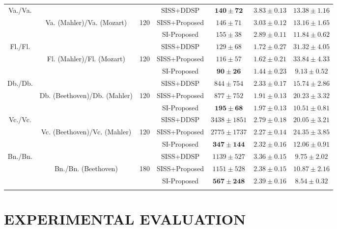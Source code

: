 \documentclass{article}
\def\tthline{\noalign{\hrule height 1.4pt}}
\begin{document}
\begin{table*}[tb]
{\begin{tabular}{ccc|c|ccc}
\multirow{3}{*}{Va./Va.}
& & &SISS+DDSP  & $\mathbf{140\pm{72}}$  & $3.83\pm{0.13}$& $13.38\pm{1.16}$\\
& Va. (Mahler)/Va. (Mozart) & 120 &SISS+Proposed & $146\pm{71}$ 
& $3.03\pm{0.12}$ & $13.16\pm{1.65}$ \\
& & &SI-Proposed  & $155\pm{38}$  & $\mathbf{2.89\pm{0.11}}$ & $\mathbf{11.84\pm{0.62}}$\\\hline

\multirow{3}{*}{Fl./Fl.}
& & &SISS+DDSP  & $129\pm{68}$  & $1.72\pm{0.27}$& $31.32\pm{4.05}$\\
& Fl. (Mahler)/Fl. (Mozart) & 120 &SISS+Proposed & $116\pm{57}$ 
& $1.62\pm{0.21}$ & $33.84\pm{4.33}$\\
& & &SI-Proposed  & $\mathbf{90\pm{26}}$  & $\mathbf{1.44\pm{0.23}}$ & $\mathbf{9.13\pm{0.52}}$\\\hline

\multirow{3}{*}{Db./Db.}
& & &SISS+DDSP  & $844\pm{754}$  & $2.33\pm{0.17}$ & $15.74\pm{2.86}$\\
& Db. (Beethoven)/Db. (Mahler) & 120 &SISS+Proposed & $877\pm{752}$ 
& $\mathbf{1.91\pm{0.13}}$ & $20.23\pm{3.32}$ \\
& & & SI-Proposed  & $\mathbf{195\pm{68}}$  & $1.97\pm{0.13}$ & $\mathbf{10.51\pm{0.81}}$\\\hline

\multirow{3}{*}{Vc./Vc.}
& & &SISS+DDSP  & $3438\pm{1851}$  & $2.79\pm{0.18}$ & $20.05\pm{3.21}$\\
& Vc. (Beethoven)/Vc. (Mahler) & 120 &SISS+Proposed & $2775\pm{1737}$ 
& $\mathbf{2.27\pm{0.14}}$ & $24.35\pm{3.85}$\\
& & &SI-Proposed  & $\mathbf{347\pm{144}}$  & $2.32\pm{0.16}$ & $\mathbf{12.06\pm{0.91}}$\\\hline

\multirow{3}{*}{Bn./Bn.}
& & &SISS+DDSP  & $1139\pm{527}$  & $3.36\pm{0.15}$ & $9.75\pm{2.02}$\\
& Bn./Bn. (Beethoven) & 180 &SISS+Proposed & $1151\pm{528}$ 
& $\mathbf{2.38\pm{0.15}}$ & $10.87\pm{2.16}$\\
& & &SI-Proposed  & $\mathbf{567\pm{248}}$  & $2.39\pm{0.16}$ & $\mathbf{8.54\pm{0.32}}$\\\tthline

\end{tabular}\hfil}
\vspace{-10pt}
\end{table*}

\section{EXPERIMENTAL EVALUATION}\label{sec:eval}
\end{document}
